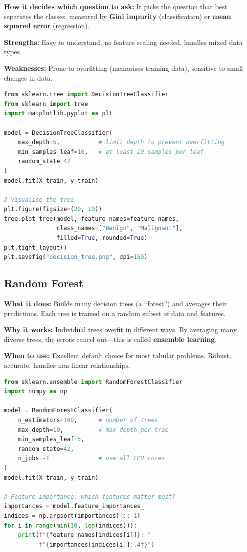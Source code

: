 \documentclass[12pt, a4paper, oneside]{book}
\begin{document}
\textbf{How it decides which question to ask:} It picks the question that best separates the classes, measured by \textbf{Gini impurity} (classification) or \textbf{mean squared error} (regression).

\textbf{Strengths:} Easy to understand, no feature scaling needed, handles mixed data types.

\textbf{Weaknesses:} Prone to overfitting (memorises training data), sensitive to small changes in data.

\begin{lstlisting}[language=Python, caption={Decision tree with visualisation}]
from sklearn.tree import DecisionTreeClassifier
from sklearn import tree
import matplotlib.pyplot as plt

model = DecisionTreeClassifier(
    max_depth=5,           # limit depth to prevent overfitting
    min_samples_leaf=10,   # at least 10 samples per leaf
    random_state=42
)
model.fit(X_train, y_train)

# Visualise the tree
plt.figure(figsize=(20, 10))
tree.plot_tree(model, feature_names=feature_names,
               class_names=["Benign", "Malignant"],
               filled=True, rounded=True)
plt.tight_layout()
plt.savefig("decision_tree.png", dpi=150)
\end{lstlisting}

\subsection{Random Forest}

\textbf{What it does:} Builds many decision trees (a ``forest'') and averages their predictions. Each tree is trained on a random subset of data and features.

\textbf{Why it works:} Individual trees overfit in different ways. By averaging many diverse trees, the errors cancel out---this is called \textbf{ensemble learning}.

\textbf{When to use:} Excellent default choice for most tabular problems. Robust, accurate, handles non-linear relationships.

\begin{lstlisting}[language=Python, caption={Random forest with feature importance}]
from sklearn.ensemble import RandomForestClassifier
import numpy as np

model = RandomForestClassifier(
    n_estimators=100,      # number of trees
    max_depth=10,          # max depth per tree
    min_samples_leaf=5,
    random_state=42,
    n_jobs=-1              # use all CPU cores
)
model.fit(X_train, y_train)

# Feature importance: which features matter most?
importances = model.feature_importances_
indices = np.argsort(importances)[::-1]
for i in range(min(10, len(indices))):
    print(f"{feature_names[indices[i]]}: "
          f"{importances[indices[i]]:.4f}")
\end{lstlisting}
\end{document}
